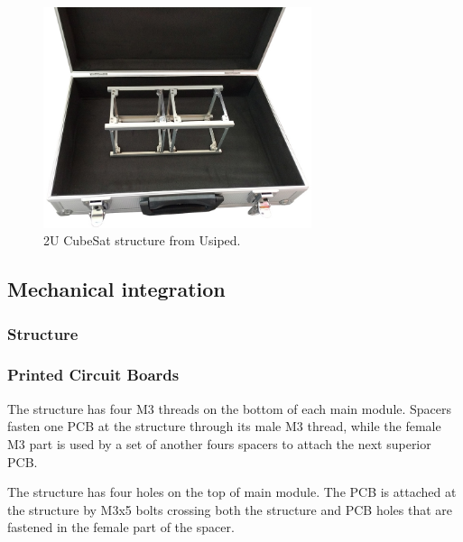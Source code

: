 \begin{figure}[!ht]
	\begin{center}
		\includegraphics[width=0.7\textwidth]{figures/usiped-2u-structure.jpg}
		\caption{2U CubeSat structure from Usiped.}
		\label{fig:usiped-structure}
	\end{center}
\end{figure}


\subsection{Mechanical integration}

\subsubsection{Structure}

\subsubsection{Printed Circuit Boards}

The structure has four M3 threads on the bottom of each main module. Spacers fasten one PCB at the structure through its male M3 thread, while the female M3 part is used by a set of another fours spacers to attach the next superior PCB. %


The structure has four holes on the top of main module. The PCB is attached at the structure by M3x5 bolts crossing both the structure and PCB holes that are fastened in the female part of the spacer. %

